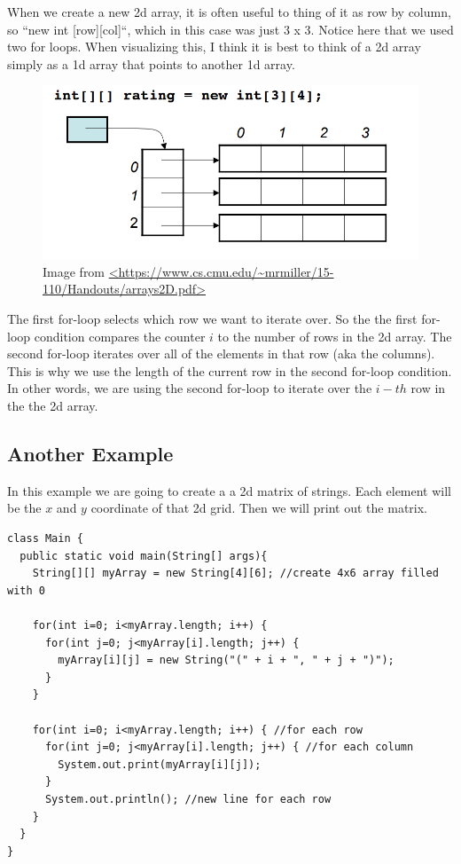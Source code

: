 \documentclass[11]{article}
\begin{document}
When we create a new 2d array, it is often useful to thing of it as row by column, so ``new int [row][col]``, which in this case was just 3 x 3. Notice here that we used two for loops. When visualizing this, I think it is best to think of a 2d array simply as a 1d array that points to another 1d array.

\begin{figure}[H]
	\centering
	\includegraphics[scale=0.4]{2darray.png}
	\caption{Image from \url{<https://www.cs.cmu.edu/~mrmiller/15-110/Handouts/arrays2D.pdf>}}
\end{figure}

The first for-loop selects which row we want to iterate over. So the the first for-loop condition compares the counter $i$ to the number of rows in the 2d array. The second for-loop iterates over all of the elements in that row (aka the columns). This is why we use the length of the current row in the second for-loop condition. In other words, we are using the second for-loop to iterate over the $i-th$ row in the the 2d array.

\subsection{Another Example}
In this example we are going to create a a 2d matrix of strings. Each element will be the $x$ and $y$ coordinate of that 2d grid. Then we will print out the matrix.

\begin{lstlisting}
class Main {
  public static void main(String[] args){
    String[][] myArray = new String[4][6]; //create 4x6 array filled with 0

    for(int i=0; i<myArray.length; i++) {
      for(int j=0; j<myArray[i].length; j++) {
        myArray[i][j] = new String("(" + i + ", " + j + ")");
      }
    }

    for(int i=0; i<myArray.length; i++) { //for each row
      for(int j=0; j<myArray[i].length; j++) { //for each column
        System.out.print(myArray[i][j]);
      }
      System.out.println(); //new line for each row
    } 
  }
}
\end{lstlisting}
\end{document}
